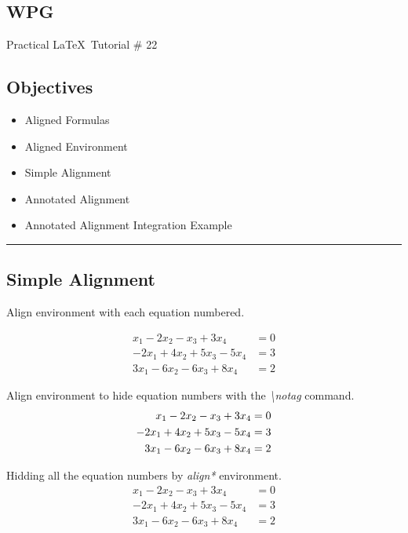 \documentclass{article}
\begin{document}
	
	\begin{center}
		\section*{WPG}
		{\Large Practical \LaTeX\, Tutorial \# 22}
	\end{center}	
	\subsection*{Objectives}
	\begin{itemize}
		\item Aligned Formulas
		\item Aligned Environment
		\item Simple Alignment
		\item Annotated Alignment
		\item Annotated Alignment Integration Example
	\end{itemize}
	\hrule
	\bigskip
	
	
	\subsection*{Simple Alignment}	
	\par Align environment with each equation numbered.
	
	\begin{align}
		x_1 - 2x_2 - x_3 + 3x_4 &= 0 \\
		-2x_1 + 4x_2 + 5x_3 - 5x_4 &= 3 \\
		3x_1 - 6x_2 -6x_3 + 8x_4 &= 2
	\end{align}
		
	\par Align environment to hide equation numbers with the \textit{\textbackslash notag} command.
	\begin{align}
		x_1 - 2x_2 - x_3 + 3x_4 &= 0 \\
		-2x_1 + 4x_2 + 5x_3 - 5x_4 &= 3 \notag\\
		3x_1 - 6x_2 -6x_3 + 8x_4 &= 2 \notag
	\end{align}
	
	\par Hidding all the equation numbers by \textit{align*} environment.
	\begin{align*}
		x_1 - 2x_2 - x_3 + 3x_4 &= 0 \\
		-2x_1 + 4x_2 + 5x_3 - 5x_4 &= 3 \\
		3x_1 - 6x_2 -6x_3 + 8x_4 &= 2 
	\end{align*}
	
\end{document}
